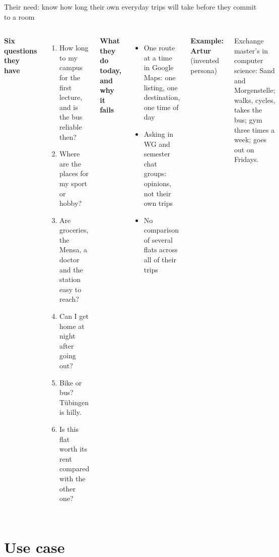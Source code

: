 \documentclass[aspectratio=169,10pt]{beamer}
\begin{document}
\begin{frame}{Their need: know how long their own everyday trips will take before they commit to
  a room}
  \begin{columns}[T,onlytextwidth]
      \textbf{Six questions they have}\par\smallskip
      \begin{enumerate}\footnotesize
        \item How long to my campus for the first lecture, and is the bus reliable then?
        \item Where are the places for my sport or hobby?
        \item Are groceries, the Mensa, a doctor and the station easy to reach?
        \item Can I get home at night after going out?
        \item Bike or bus? Tübingen is hilly.
        \item Is this flat worth its rent compared with the other one?
      \end{enumerate}
      \textbf{What they do today, and why it fails}\par\smallskip
      \begin{itemize}\footnotesize
        \item One route at a time in Google Maps: one listing, one destination, one time of day
        \item Asking in WG and semester chat groups: opinions, not their own trips
        \item No comparison of several flats across all of their trips
      \end{itemize}
      \medskip
      \textbf{Example: Artur} {\footnotesize\color{muted}(invented persona)}\par\smallskip
      {\footnotesize Exchange master's in computer science: Sand and Morgenstelle; walks,
      cycles, takes the bus; gym three times a week; goes out on Fridays.\par}
  \end{columns}
\end{frame}

\section{Use case}
\end{document}
